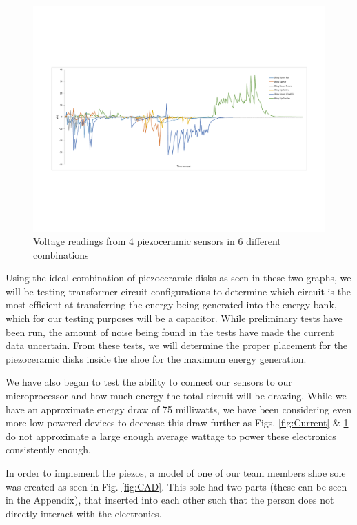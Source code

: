 \documentclass[letterpaper, 12 pt, onecolumn, hidelinks]{ieeetran}
\begin{document}
\begin{figure}[h]
	\begin{center}
		\includegraphics[trim=55 200 75 170, clip, width=\columnwidth]{Voltage.pdf}
	\end{center}
	\vspace{-1em}
	\caption{\label{fig:Voltage}Voltage readings from 4 piezoceramic sensors in 6 different combinations}
\end{figure}

Using the ideal combination of piezoceramic disks as seen in these two graphs, we will be testing transformer circuit configurations to determine which circuit is the most efficient at transferring the energy being generated into the energy bank, which for our testing purposes will be a capacitor. While preliminary tests have been run, the amount of noise being found in the tests have made the current data uncertain. From these tests, we will determine the proper placement for the piezoceramic disks inside the shoe for the maximum energy generation.

We have also began to test the ability to connect our sensors to our microprocessor and how much energy the total circuit will be drawing. While we have an approximate energy draw of 75 milliwatts, we have been considering even more low powered devices to decrease this draw further as Figs. \ref{fig:Current} \& \ref{fig:Voltage} do not approximate a large enough average wattage to power these electronics consistently enough.

In order to implement the piezos, a model of one of our team members shoe sole was created as seen in Fig. \ref{fig:CAD}. This sole had two parts (these can be seen in the Appendix), that inserted into each other such that the person does not directly interact with the electronics.
\end{document}
